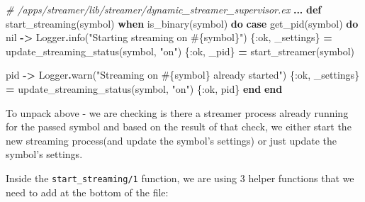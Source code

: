 \documentclass[
  oneside]{book}
\newenvironment{Shaded}{\begin{snugshade}}{\end{snugshade}}
\newcommand{\CommentTok}[1]{\textcolor[rgb]{0.56,0.35,0.01}{\textit{#1}}}
\newcommand{\ConstantTok}[1]{\textcolor[rgb]{0.00,0.00,0.00}{#1}}
\newcommand{\KeywordTok}[1]{\textcolor[rgb]{0.13,0.29,0.53}{\textbf{#1}}}
\newcommand{\NormalTok}[1]{#1}
\newcommand{\OperatorTok}[1]{\textcolor[rgb]{0.81,0.36,0.00}{\textbf{#1}}}
\newcommand{\OtherTok}[1]{\textcolor[rgb]{0.56,0.35,0.01}{#1}}
\newcommand{\StringTok}[1]{\textcolor[rgb]{0.31,0.60,0.02}{#1}}
\newcommand{\VariableTok}[1]{\textcolor[rgb]{0.00,0.00,0.00}{#1}}
\begin{document}
\begin{Shaded}
\begin{Highlighting}[]
\CommentTok{\# /apps/streamer/lib/streamer/dynamic\_streamer\_supervisor.ex}
  \OperatorTok{...}
  \KeywordTok{def}\NormalTok{ start\_streaming(symbol) }\KeywordTok{when}\NormalTok{ is\_binary(symbol) }\KeywordTok{do}
    \KeywordTok{case}\NormalTok{ get\_pid(symbol) }\KeywordTok{do}
      \ConstantTok{nil} \OperatorTok{{-}\textgreater{}}
        \ConstantTok{Logger}\OperatorTok{.}\NormalTok{info(}\StringTok{"Starting streaming on }\OtherTok{\#\{}\NormalTok{symbol}\OtherTok{\}}\StringTok{"}\NormalTok{)}
\NormalTok{        \{}\VariableTok{:ok}\NormalTok{, \_settings\} }\OperatorTok{=}\NormalTok{ update\_streaming\_status(symbol, }\StringTok{"on"}\NormalTok{)}
\NormalTok{        \{}\VariableTok{:ok}\NormalTok{, \_pid\} }\OperatorTok{=}\NormalTok{ start\_streamer(symbol)}

\NormalTok{      pid }\OperatorTok{{-}\textgreater{}}
        \ConstantTok{Logger}\OperatorTok{.}\NormalTok{warn(}\StringTok{"Streaming on }\OtherTok{\#\{}\NormalTok{symbol}\OtherTok{\}}\StringTok{ already started"}\NormalTok{)}
\NormalTok{        \{}\VariableTok{:ok}\NormalTok{, \_settings\} }\OperatorTok{=}\NormalTok{ update\_streaming\_status(symbol, }\StringTok{"on"}\NormalTok{)}
\NormalTok{        \{}\VariableTok{:ok}\NormalTok{, pid\}}
    \KeywordTok{end}
  \KeywordTok{end}
\end{Highlighting}
\end{Shaded}

To unpack above - we are checking is there a streamer process already running for the passed symbol and based on the result of that check, we either start the new streaming process(and update the symbol's settings) or just update the symbol's settings.

Inside the \texttt{start\_streaming/1} function, we are using 3 helper functions that we need to add at the bottom of the file:
\end{document}
